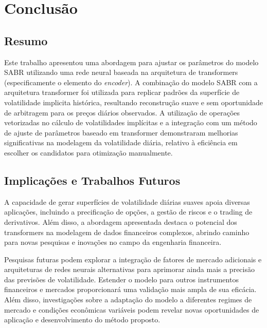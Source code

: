 \section{Conclusão}
\subsection{Resumo}

Este trabalho apresentou uma abordagem para ajustar os parâmetros do modelo SABR utilizando uma rede neural baseada na arquitetura de transformers (especificamente o elemento do \textit{encoder}). A combinação do modelo SABR com a arquitetura transformer foi utilizada para replicar padrões da superfície de volatilidade implicita histórica, resultando reconstrução suave e sem oportunidade de arbitragem para os preços diários observados. A utilização de operações vetorizadas no cálculo de volatilidades implícitas e a integração com um método de ajuste de parâmetros baseado em transformer demonstraram melhorias significativas na modelagem da volatilidade diária, relativo à eficiência em escolher os candidatos para otimização manualmente.

\subsection{Implicações e Trabalhos Futuros}

A capacidade de gerar superfícies de volatilidade diárias suaves apoia diversas aplicações, incluindo a precificação de opções, a gestão de riscos e o trading de derivativos. Além disso, a abordagem apresentada destaca o potencial dos transformers na modelagem de dados financeiros complexos, abrindo caminho para novas pesquisas e inovações no campo da engenharia financeira.

Pesquisas futuras podem explorar a integração de fatores de mercado adicionais e arquiteturas de redes neurais alternativas para aprimorar ainda mais a precisão das previsões de volatilidade. Estender o modelo para outros instrumentos financeiros e mercados proporcionará uma validação mais ampla de sua eficácia. Além disso, investigações sobre a adaptação do modelo a diferentes regimes de mercado e condições econômicas variáveis podem revelar novas oportunidades de aplicação e desenvolvimento do método proposto.

